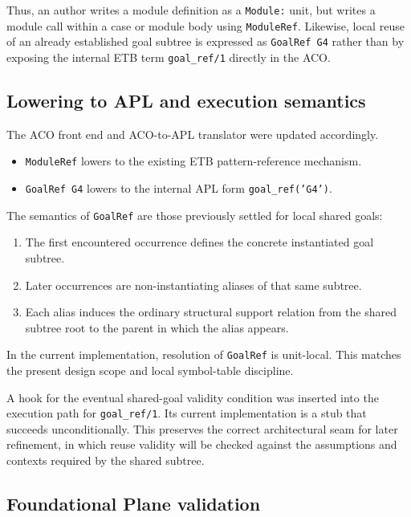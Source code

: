 \documentclass[12pt,twoside,a4paper]{article}
\begin{document}
Thus, an author writes a module definition as a \texttt{Module:} unit, but
writes a module call within a case or module body using \texttt{ModuleRef}.
Likewise, local reuse of an already established goal subtree is expressed as
\texttt{GoalRef G4} rather than by exposing the internal ETB term
\texttt{goal\_ref/1} directly in the ACO.

\subsection{Lowering to APL and execution semantics}

The ACO front end and ACO-to-APL translator were updated accordingly.

\begin{itemize}
\item \texttt{ModuleRef} lowers to the existing ETB pattern-reference mechanism.
\item \texttt{GoalRef G4} lowers to the internal APL form
      \texttt{goal\_ref('G4')}.
\end{itemize}

The semantics of \texttt{GoalRef} are those previously settled for local shared
goals:

\begin{enumerate}
\item The first encountered occurrence defines the concrete instantiated goal
      subtree.
\item Later occurrences are non-instantiating aliases of that same subtree.
\item Each alias induces the ordinary structural support relation from the
      shared subtree root to the parent in which the alias appears.
\end{enumerate}

In the current implementation, resolution of \texttt{GoalRef} is unit-local.
This matches the present design scope and local symbol-table discipline.

A hook for the eventual shared-goal validity condition was inserted into the
execution path for \texttt{goal\_ref/1}. Its current implementation is a stub
that succeeds unconditionally. This preserves the correct architectural seam
for later refinement, in which reuse validity will be checked against the
assumptions and contexts required by the shared subtree.

\subsection{Foundational Plane validation}
\end{document}
